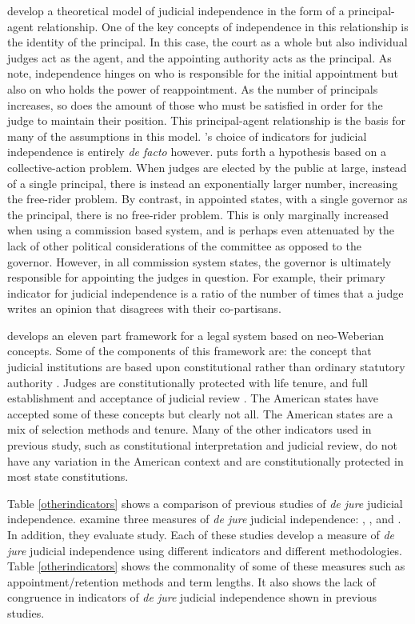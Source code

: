 \documentclass[JohnsonMADraft2.tex]{subfiles}
\begin{document}
\citet{Choi2010} develop a theoretical model of judicial independence in the form of a principal-agent relationship.  One of the key concepts of independence in this relationship is the identity of the principal.  In this case, the court as a whole but also individual judges act as the agent, and the appointing authority acts as the principal.  As \citeauthor{Choi2010} note, independence hinges on who is responsible for the initial appointment but also on who holds the power of reappointment.  As the number of principals increases, so does the amount of those who must be satisfied in order for the judge to maintain their position.  This principal-agent relationship is the basis for many of the assumptions in this model.  \citet{Choi2010}'s choice of indicators for judicial independence is entirely \textit{de facto} however.  \citet[296]{Choi2010} puts forth a hypothesis based on a collective-action problem.  When judges are elected by the public at large, instead of a single principal, there is instead an exponentially larger number, increasing the free-rider problem.  By contrast, in appointed states, with a single governor as the principal, there is no free-rider problem.  This is only marginally increased when using a commission based system, and is perhaps even attenuated by the lack of other political considerations of the committee as opposed to the governor.  However, in all commission system states, the governor is ultimately responsible for appointing the judges in question.  For example, their primary indicator for judicial independence is a ratio of the number of times that a judge writes an opinion that disagrees with their co-partisans.

\citet{Schmidhauser1987} develops an eleven part framework for a legal system based on neo-Weberian concepts.  Some of the components of this framework are: the concept that judicial institutions are based upon constitutional rather than ordinary statutory authority \citep{Schmidhauser1987}.  Judges are constitutionally protected with life tenure, and full establishment and acceptance of judicial review \citep[46-47]{Schmidhauser1987}.  The American states have accepted some of these concepts but clearly not all.  The American states are a mix of selection methods and tenure.  Many of the other indicators used in previous study, such as constitutional interpretation and judicial review, do not have any variation in the American context and are constitutionally protected in most state constitutions. 

Table \ref{otherindicators} shows a comparison of previous studies of \textit{de jure} judicial independence.  \citet{Rios2014} examine three measures of \textit{de jure} judicial independence: \citet{Feld2003}, \citet{Keith2002a}, and \citet{Laporta2004}.  In addition, they evaluate \citet{Apodaca2004} study.  Each of these studies develop a measure of \textit{de jure} judicial independence using different indicators and different methodologies.  Table \ref{otherindicators} shows the commonality of some of these measures such as appointment/retention methods and term lengths.  It also shows the lack of congruence in indicators of \textit{de jure} judicial independence shown in previous studies.
\end{document}
